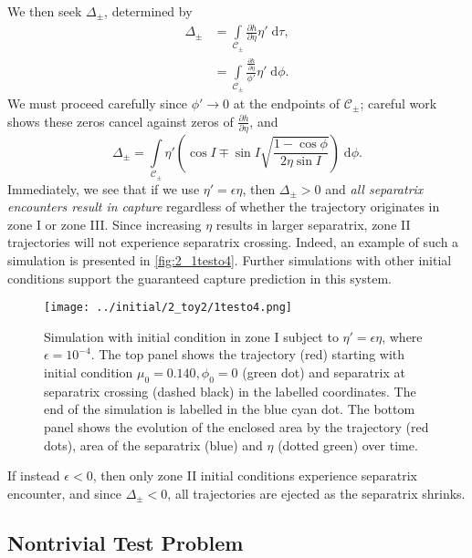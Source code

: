 \documentclass[
        fleqn,
        usenatbib,
    ]{mnras}
\newcommand*{\pd}[2]{\frac{\partial#1}{\partial#2}}
\newcommand*{\p}[1]{\left(#1\right)}
\begin{document}
We then seek $\Delta_{\pm}$, determined by
\begin{align}
    \Delta_{\pm} &= \int\limits_{\mathcal{C}_{\pm}}
            \pd{h}{\eta}\eta'\;\mathrm{d}\tau,\nonumber\\
        &= \int\limits_{\mathcal{C}_{\pm}}
            \frac{\pd{h}{\eta}}{\phi'}\eta'\;\mathrm{d}\phi.
\end{align}
We must proceed carefully since $\phi' \to 0$ at the endpoints of
$\mathcal{C}_{\pm}$; careful work shows these zeros cancel against zeros of
$\pd{h}{\eta}$, and
\begin{equation}
    \Delta_{\pm} = \int\limits_{\mathcal{C}_{\pm}} \eta'
        \p{\cos I \mp \sin I \sqrt{\frac{1 - \cos \phi}{2\eta\sin I}}}
            \;\mathrm{d}\phi.\label{eq:p2_delta}
\end{equation}
Immediately, we see that if we use $\eta' = \epsilon \eta$, then $\Delta_{\pm} >
0$ and \emph{all separatrix encounters result in capture} regardless of whether
the trajectory originates in zone I or zone III\@. Since increasing $\eta$
results in larger separatrix, zone II trajectories will not experience
separatrix crossing. Indeed, an example of such a simulation is presented in
\autoref{fig:2_1testo4}. Further simulations with other initial conditions
support the guaranteed capture prediction in this system.
\begin{figure}[t]
    \centering
    \texttt{[image: ../initial/2\_toy2/1testo4.png]}
    \caption{Simulation with initial condition in zone I subject to $\eta' =
    \epsilon \eta$, where $\epsilon = 10^{-4}$. The top panel shows the
    trajectory (red) starting with initial condition $\mu_0 = 0.140, \phi_0 = 0$
    (green dot) and separatrix at separatrix crossing (dashed black) in
    the labelled coordinates. The end of the simulation is labelled in the blue
    cyan dot. The bottom panel shows the evolution of the enclosed area by the
    trajectory (red dots), area of the separatrix (blue) and $\eta$ (dotted
    green) over time.}\label{fig:2_1testo4}
\end{figure}

If instead $\epsilon < 0$, then only zone II initial conditions experience
separatrix encounter, and since $\Delta_{\pm} < 0$, all trajectories are
ejected as the separatrix shrinks.

\subsection{Nontrivial Test Problem}\label{ss:p2_toy}
\end{document}
